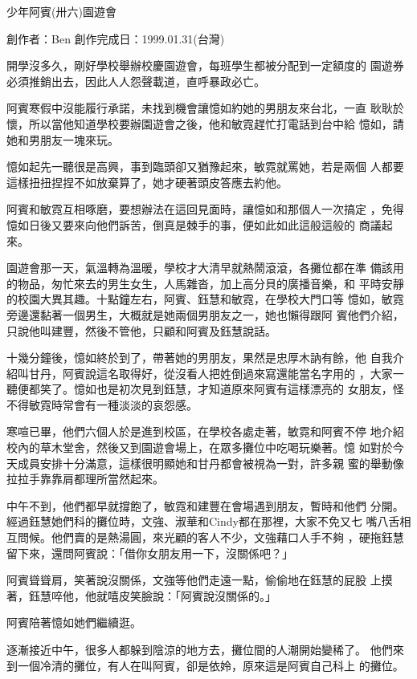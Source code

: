 



少年阿賓(卅六)園遊會

創作者：Ben
創作完成日：1999.01.31(台灣)


開學沒多久，剛好學校舉辦校慶園遊會，每班學生都被分配到一定額度的
園遊券必須推銷出去，因此人人怨聲載道，直呼暴政必亡。

阿賓寒假中沒能履行承諾，未找到機會讓憶如約她的男朋友來台北，一直
耿耿於懷，所以當他知道學校要辦園遊會之後，他和敏霓趕忙打電話到台中給
憶如，請她和男朋友一塊來玩。

憶如起先一聽很是高興，事到臨頭卻又猶豫起來，敏霓就罵她，若是兩個
人都要這樣扭扭捏捏不如放棄算了，她才硬著頭皮答應去約他。

阿賓和敏霓互相啄磨，要想辦法在這回見面時，讓憶如和那個人一次搞定
，免得憶如日後又要來向他們訴苦，倒真是棘手的事，便如此如此這般這般的
商議起來。

園遊會那一天，氣溫轉為溫暖，學校才大清早就熱鬧滾滾，各攤位都在準
備該用的物品，匆忙來去的男生女生，人馬雜沓，加上高分貝的廣播音樂，和
平時安靜的校園大異其趣。十點鐘左右，阿賓、鈺慧和敏霓，在學校大門口等
憶如，敏霓旁邊還黏著一個男生，大概就是她兩個男朋友之一，她也懶得跟阿
賓他們介紹，只說他叫建豐，然後不管他，只顧和阿賓及鈺慧說話。

十幾分鐘後，憶如終於到了，帶著她的男朋友，果然是忠厚木訥有餘，他
自我介紹叫甘丹，阿賓說這名取得好，從沒看人把姓倒過來寫還能當名字用的
，大家一聽便都笑了。憶如也是初次見到鈺慧，才知道原來阿賓有這樣漂亮的
女朋友，怪不得敏霓時常會有一種淡淡的哀怨感。

寒喧已畢，他們六個人於是進到校區，在學校各處走著，敏霓和阿賓不停
地介紹校內的草木堂舍，然後又到園遊會場上，在眾多攤位中吃喝玩樂著。憶
如對於今天成員安排十分滿意，這樣很明顯她和甘丹都會被視為一對，許多親
蜜的舉動像拉拉手靠靠肩都理所當然起來。

中午不到，他們都早就撐飽了，敏霓和建豐在會場遇到朋友，暫時和他們
分開。經過鈺慧她們科的攤位時，文強、淑華和Cindy都在那裡，大家不免又七
嘴八舌相互問候。他們賣的是熱湯圓，來光顧的客人不少，文強藉口人手不夠
，硬拖鈺慧留下來，還問阿賓說：「借你女朋友用一下，沒關係吧？」

阿賓聳聳肩，笑著說沒關係，文強等他們走遠一點，偷偷地在鈺慧的屁股
上摸著，鈺慧啐他，他就嘻皮笑臉說：「阿賓說沒關係的。」

阿賓陪著憶如她們繼續逛。

逐漸接近中午，很多人都躲到陰涼的地方去，攤位間的人潮開始變稀了。
他們來到一個冷清的攤位，有人在叫阿賓，卻是依姈，原來這是阿賓自己科上
的攤位。

